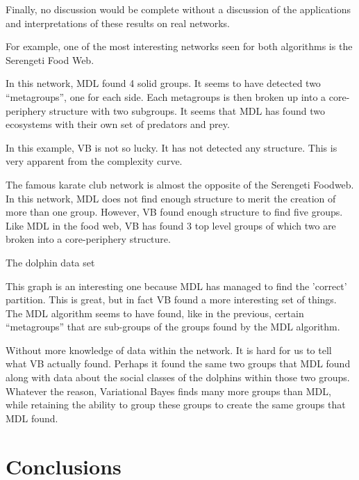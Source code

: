 Finally, no discussion would be complete without a discussion of
the applications and interpretations of these results on real networks.

For example, one of the most interesting networks seen for both algorithms
is the Serengeti Food Web\cite{Baskerville2011}.


In this network, MDL found 4 solid groups. It seems to have detected
two ``metagroups'', one for each side. Each metagroups is then broken up
into a core-periphery structure with two subgroups. It seems that MDL
has found two ecosystems with their own set of predators and prey.

In this example, VB is not so lucky. It has not detected any structure. This
is very apparent from the complexity curve.



The famous karate club network\cite{Zachary1977} is almost the opposite of the Serengeti
Foodweb. In this network, MDL does not find enough structure to merit the
creation of more than one group. However, VB found enough structure to
find five groups. Like MDL in the food web, VB has found 3 top level groups
of which two are broken into a core-periphery structure.

The dolphin data set\cite{Lusseau2003}

This graph is an interesting one because MDL has managed to find the 'correct'
partition. This is great, but in fact VB found a more interesting set of
things. The MDL algorithm seems to have found, like in the previous, certain
``metagroups'' that are sub-groups of the groups found by the MDL algorithm.


Without more knowledge of data within the network. It is hard for us to tell
what VB actually found. Perhaps it found the same two groups that MDL found
along with data about the social classes of the dolphins within those two
groups. Whatever the reason, Variational Bayes finds many more groups than MDL,
while retaining the ability to group these groups to create the same groups
that MDL found.

\section*{Conclusions}

